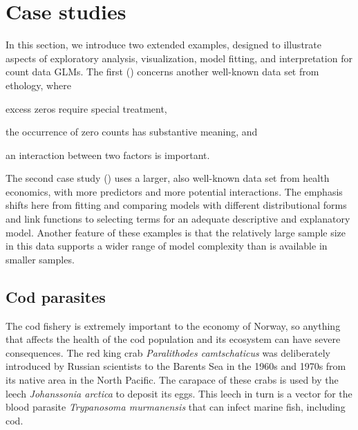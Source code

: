 \documentclass[11pt]{book}\usepackage[]{graphicx}\usepackage[]{color}
\begin{document}

\section{Case studies}\label{sec:glm-casestudies}
In this section, we introduce two extended examples, designed to illustrate aspects of
exploratory analysis, visualization, model fitting, and interpretation for count data GLMs.
The first ()
concerns another well-known data set from ethology, where 
\begin{seriate}
\item excess zeros require special treatment,
\item the occurrence of zero counts has substantive meaning, and
\item an interaction between two factors is important.
\end{seriate}

The second case study ()
uses a larger, also well-known
data set from health economics, with more predictors and more
potential interactions. The emphasis shifts here from fitting and comparing models with 
different distributional forms and link functions to selecting terms for an adequate descriptive
and explanatory model. Another feature of these examples is that the relatively large sample size
in this data supports a wider range of model complexity than is available in smaller samples.
 

\subsection{Cod parasites}\label{sec:glm-case-cod}
The cod fishery is extremely important to the economy of Norway, so anything that affects the
health of the cod population and its ecosystem can have severe consequences.
The red king crab \emph{Paralithodes camtschaticus} was deliberately introduced by Russian scientists
to the Barents Sea in the 1960s and 1970s from its native area in the North Pacific. The carapace of these crabs is used by the leech \emph{Johanssonia arctica} to deposit its eggs. This leech in turn is a vector for the blood parasite 
\emph{Trypanosoma murmanensis} that can infect marine fish, including cod.
\end{document}
